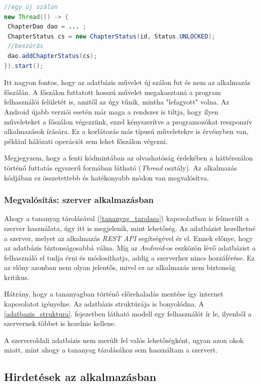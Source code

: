 \documentclass[12pt,a4paper]{article}
\begin{document}
	\begin{lstlisting}[language=Java]
//egy új szálon
new Thread(() -> {
 ChapterDao dao = ... ;
 ChapterStatus cs = new ChapterStatus(id, Status.UNLOCKED);
 //beszúrás
 dao.addChapterStatus(cs);
}).start();
	\end{lstlisting}
	
	Itt nagyon fontos, hogy az adatbázis művelet új szálon fut és nem az alkalmazás főszálán. A főszálon futtatott hosszú művelet megakasztaná a program felhasználói felületét is, amitől az úgy tűnik, mintha "lefagyott" volna. Az Android újabb verziói esetén már maga a rendszer is tiltja, hogy ilyen műveleteket 
	a főszálon végezzünk, ezzel kényszerítve a programozókat reszponzív alkalmazások írására. Ez a korlátozás más típusú műveletekre is érvényben van, például hálózati operációt sem lehet főszálon végezni.
	
	Megjegyzem, hogy a fenti kódmintában az olvashatóság érdekében a háttérszálon történő futtatás egyszerű formában látható (\textit{Thread} osztály). Az alkalmazás kódjában ez összetettebb és hatékonyabb módon van megvalósítva. 
	
	\subsubsection{Megvalósítás: szerver alkalmazásban}
	
	Ahogy a tananyag tárolásával (\ref{tananyag_tarolasa}) kapcsolatban is felmerült a szerver használata, úgy itt is megjelenik, mint lehetőség. Az adatbázist kezelhetné a szerver, melyet az alkalmazás \textit{REST API} segítségével ér el. Ennek előnye, hogy az adatbázis biztonságosabbá válna. Míg az \textit{Android}-os eszközön lévő adatbázist a felhasználó el tudja érni és módosíthatja, addig a szerverhez nincs hozzáférése. Ez az előny azonban nem olyan jelentős, mivel ez az alkalmazás nem biztonság kritikus. 
	
	Hátrány, hogy a tananyagban történő előrehaladás mentése így internet kapcsolatot igényelne. Az adatbázis struktúrája is bonyolódna. A \ref{adatbazis_struktura}. fejezetben látható modell egy felhasználót ír le, ilyenből a szervernek többet is kezelnie kellene.
	
	A szerveroldali adatbázis nem merült fel valós lehetőségként, ugyan azon okok miatt, mint ahogy a tananyag tárolásához sem használtam a szervert.

	\subsection{Hirdetések az alkalmazásban}
	
\end{document}

